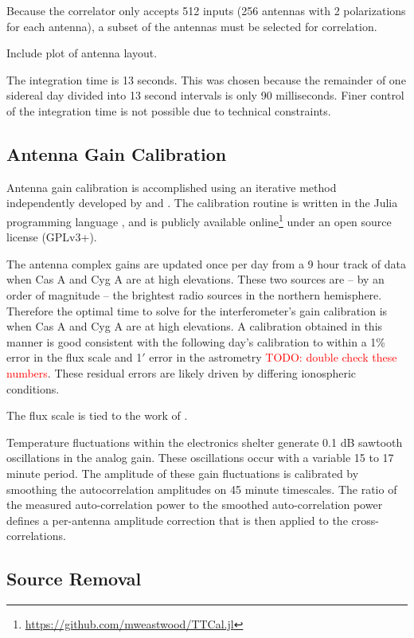 \documentclass[twocolumn]{aastex6}
\newcommand{\todo}[1]{\textcolor{red}{TODO: #1}\PackageWarning{TODO:}{#1!}}
\begin{document}
Because the correlator only accepts 512 inputs (256 antennas with 2 polarizations for each antenna),
a subset of the antennas must be selected for correlation.

Include plot of antenna layout.

The integration time is 13 seconds. This was chosen because the remainder of one sidereal day
divided into 13 second intervals is only 90 milliseconds.  Finer control of the integration time is
not possible due to technical constraints.

\subsection{Antenna Gain Calibration}

Antenna gain calibration is accomplished using an iterative method independently developed by
\citet{2008ISTSP...2..707M} and \citet{2014A&A...571A..97S}. The calibration routine is written in
the Julia programming language \citep{doi:10.1137/141000671}, and is publicly available
online\footnote{\url{https://github.com/mweastwood/TTCal.jl}} under an open source license (GPLv3+).

The antenna complex gains are updated once per day from a 9 hour track of data when Cas A and Cyg A
are at high elevations.  These two sources are -- by an order of magnitude -- the brightest radio
sources in the northern hemisphere.  Therefore the optimal time to solve for the interferometer's
gain calibration is when Cas A and Cyg A are at high elevations. A calibration obtained in this
manner is good consistent with the following day's calibration to within a 1\% error in the flux
scale and 1$'$ error in the astrometry \todo{double check these numbers}. These residual errors are
likely driven by differing ionospheric conditions.

The flux scale is tied to the work of \citet{2016arXiv160905940P}.

Temperature fluctuations within the electronics shelter generate 0.1 dB sawtooth oscillations in the
analog gain. These oscillations occur with a variable 15 to 17 minute period. The amplitude of these
gain fluctuations is calibrated by smoothing the autocorrelation amplitudes on 45 minute timescales.
The ratio of the measured auto-correlation power to the smoothed auto-correlation power defines a
per-antenna amplitude correction that is then applied to the cross-correlations.

\subsection{Source Removal}
\end{document}
